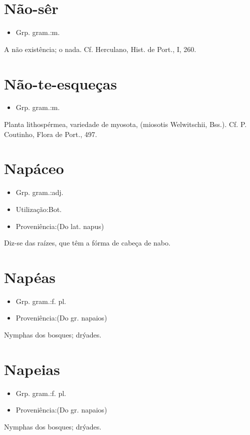 \section{Não-sêr}
\begin{itemize}
\item {Grp. gram.:m.}
\end{itemize}
A não existência; o nada. Cf. Herculano, \textunderscore Hist. de Port.\textunderscore , I, 260.
\section{Não-te-esqueças}
\begin{itemize}
\item {Grp. gram.:m.}
\end{itemize}
Planta lithospérmea, variedade de myosota, (\textunderscore miosotis Welwitschii\textunderscore , Bss.). Cf. P. Coutinho, \textunderscore Flora de Port.\textunderscore , 497.
\section{Napáceo}
\begin{itemize}
\item {Grp. gram.:adj.}
\end{itemize}
\begin{itemize}
\item {Utilização:Bot.}
\end{itemize}
\begin{itemize}
\item {Proveniência:(Do lat. \textunderscore napus\textunderscore )}
\end{itemize}
Diz-se das raízes, que têm a fórma de cabeça de nabo.
\section{Napéas}
\begin{itemize}
\item {Grp. gram.:f. pl.}
\end{itemize}
\begin{itemize}
\item {Proveniência:(Do gr. \textunderscore napaios\textunderscore )}
\end{itemize}
Nymphas dos bosques; drýades.
\section{Napeias}
\begin{itemize}
\item {Grp. gram.:f. pl.}
\end{itemize}
\begin{itemize}
\item {Proveniência:(Do gr. \textunderscore napaios\textunderscore )}
\end{itemize}
Nymphas dos bosques; drýades.
